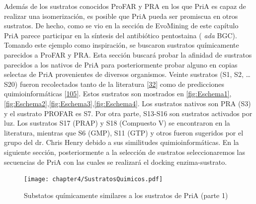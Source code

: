 \documentclass[12pt,twoside]{reedthesis}
\begin{document}
  Además de los sustratos conocidos ProFAR y PRA en los que PriA es capaz
  de realizar una isomerización, es posible que PriA pueda ser promiscua
  en otros sustratos. De hecho, como se vio en la sección de EvoMining de
  este capítulo PriA parece participar en la síntesis del antibiótico
  pentostaina ( \emph{ada} BGC). Tomando este ejemplo como inspiración, se
  buscaron sustratos químicamente parecidos a ProFAR y PRA. Esta sección
  buscará probar la afinidad de sustratos parecidos a los nativos de PriA
  para posteriormente probar alguno en copias selectas de PriA
  provenientes de diversos organismos. Veinte sustratos (S1, S2, \ldots{}
  S20) fueron recolectados tanto de la literatura
  {[}\protect\hyperlink{ref-adams_promiscuous_2014}{32}{]} como de
  predicciones quimioinformáticas
  {[}\protect\hyperlink{ref-jeffryes_mines_2015}{105}{]}. Estos sustratos
  son mostrados en \autoref{fig:Eschema1},
  \autoref{fig:Eschema2},\autoref{fig:Eschema3},\autoref{fig:Eschema4}.
  Los sustratos nativos son PRA (S3) y el sustrato PROFAR es S7. Por otra
  parte, S13-S16 son sustratos activados por luz. Los sustratos S17 (PRAP)
  y S18 (Compuesto V) se encontraron en la literatura, mientras que S6
  (GMP), S11 (GTP) y otros fueron sugeridos por el grupo del dr. Chris
  Henry debido a sus similitudes quimioinformáticas. En la siguiente
  sección, posteriormente a la selección de sustratos seleccionaremos las
  secuencias de PriA con las cuales se realizará el docking
  enzima-sustrato.
  
  \begin{figure}[h!tbp]
  \centering
  \texttt{[image: chapter4/SustratosQuimicos.pdf]}
  \caption[Substatos químicamente similares a los sustratos de PriA (parte 1)]{\footnotesize{Substatos químicamente similares a los sustratos de PriA (parte 1)}}
  \label{fig:Eschema1}
  \end{figure}
  
\end{document}
